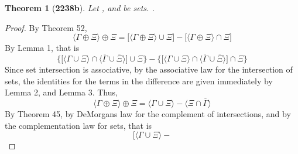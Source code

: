 \documentclass[preview]{standalone}
\newtheorem{theorem}{Theorem}
\begin{document}
\begin{theorem}[\textbf{2238b}]
    Let \bm{$\Gamma$}, and \bm{$\Xi$} be sets.
    \bm{$
    \big \langle \Gamma \oplus \Xi \big \rangle
        \oplus 
    \Xi 
        = 
    \Gamma$}.
\end{theorem}
\begin{proof}
    By Theorem 52, 
    \begin{equation*}
        \Big \langle \Gamma \oplus \Xi \Big \rangle 
            \oplus 
        \Xi 
            = 
        \bigg[
            \Big \langle \Gamma \oplus \Xi \Big \rangle 
                \cup 
            \Xi
        \bigg] 
            - 
        \bigg[
            \Big \langle \Gamma \oplus \Xi \Big \rangle
                \cap 
            \Xi
        \bigg]
    \end{equation*}
    By Lemma 1, that is
    \begin{equation*}
        \Bigg\{
            \bigg[
                \Big \langle \Gamma \cup \Xi \Big \rangle
                    \cap
                \Big \langle
                    \overline{\Gamma} 
                        \cup 
                    \overline{\Xi} 
                \Big \rangle
            \bigg]
                \cup
            \Xi
        \Bigg\}
            -
        \Bigg\{
            \bigg[
                \Big \langle \Gamma \cup \Xi \Big \rangle
                    \cap
                \Big \langle
                    \overline{\Gamma} 
                        \cup 
                    \overline{\Xi} 
                \Big \rangle
            \bigg]
                \cap
            \Xi
        \Bigg\}
    \end{equation*}
    Since set intersection is associative, 
    by the associative law for the intersection of sets, 
    the identities for the terms in the difference are given immediately
    by Lemma 2, and Lemma 3. Thus, 
    \begin{equation*}
        \Big \langle \Gamma \oplus \Xi \Big \rangle 
            \oplus 
        \Xi
            =
        \Big \langle \Gamma \cup \Xi \Big \rangle
            -
        \Big \langle 
            \Xi
                \cap 
            \overline{\Gamma} 
        \Big \rangle
    \end{equation*}
    By Theorem 45, 
    by DeMorgans law for the complement of intersections, 
    and by the complementation law for sets, 
    that is
    \begin{equation*}
        \bigg[
            \Big \langle \Gamma \cup \Xi \Big \rangle
                -

\end{equation*}
\end{proof}
\end{document}
